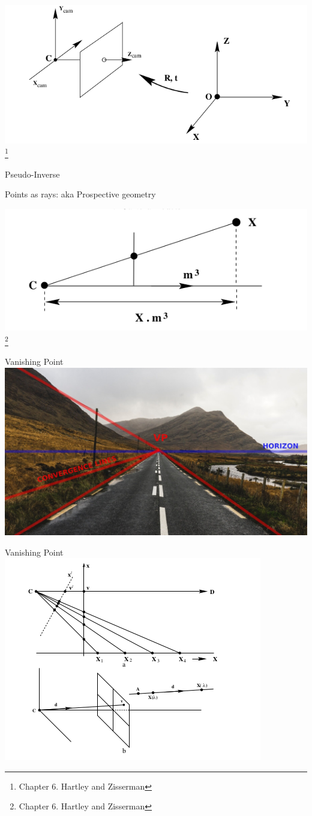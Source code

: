 \documentclass{beamer}
\begin{document}
  \begin{frame}
    \includegraphics[width=0.4\linewidth]{media/world-camera-transformation.png}
    \footnote{Chapter 6. Hartley and Zisserman}
  \end{frame}

  \begin{frame}{Pseudo-Inverse}

  \end{frame}

  \begin{frame}{Points as rays: aka Prospective geometry}
  \end{frame}

  \begin{frame}
    \includegraphics[width=0.4\linewidth]{media/recovering-ray-from-point.png}
    \footnote{Chapter 6. Hartley and Zisserman}
  \end{frame}

  \begin{frame}{Vanishing Point}
    \includegraphics[width=0.7\linewidth]{media/vanishing-lines.jpeg}
  \end{frame}

  \begin{frame}{Vanishing Point}
    \includegraphics[width=0.5\linewidth]{media/vanishing-point-formation.png}
  \end{frame}
\end{document}
